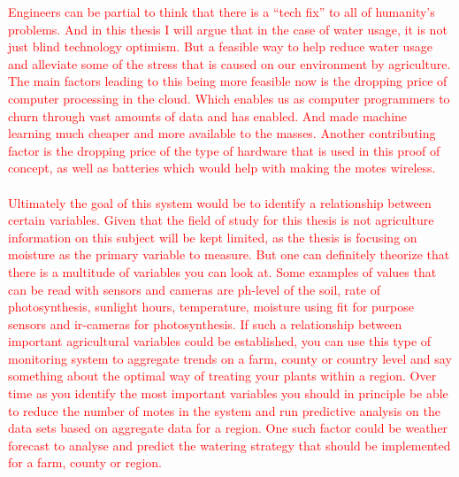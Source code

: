 \documentclass[]{uiophd}
\begin{document}
\textcolor{red}{Engineers can be partial to think that there is a “tech fix” to all of humanity's problems. And in this thesis I will argue that in the case of water usage, it is not just blind technology optimism. But a feasible way to help reduce water usage and alleviate some of the stress that is caused on our environment by agriculture. The main factors leading to this being more feasible now is the dropping price of computer processing in the cloud. Which enables us as computer programmers to churn through vast amounts of data and has enabled. And made machine learning much cheaper and more available to the masses. Another contributing factor is the dropping price of the type of hardware that is used in this proof of concept, as well as batteries which would help with making the motes wireless.
\\\\
Ultimately the goal of this system would be to identify a relationship between certain variables.  Given that the field of study for this thesis is not agriculture information on this subject will be kept limited, as the thesis is focusing on moisture as the primary variable to measure. But one can definitely theorize that there is a multitude of variables you can look at. Some examples of values that can be read with sensors and cameras are ph-level of the soil, rate of photosynthesis, sunlight hours, temperature, moisture using fit for purpose sensors and ir-cameras for photosynthesis. If such a relationship between important agricultural variables could be established, you can use this type of monitoring system to aggregate trends on a farm, county or country level and say something about the optimal way of treating your plants within a region. Over time as you identify the most important variables you should in principle be able to reduce the number of motes in the system and run predictive analysis on the data sets based on aggregate data for a region. One such factor could be weather forecast to analyse and predict the watering strategy that should be implemented for a farm, county or region. }
\end{document}
